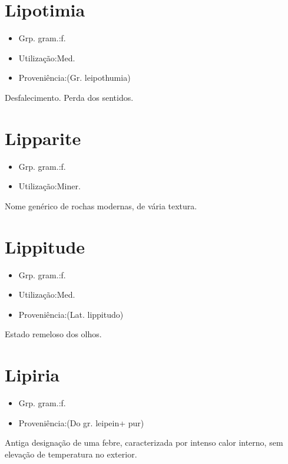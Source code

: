 \section{Lipotimia}
\begin{itemize}
\item {Grp. gram.:f.}
\end{itemize}
\begin{itemize}
\item {Utilização:Med.}
\end{itemize}
\begin{itemize}
\item {Proveniência:(Gr. \textunderscore leipothumia\textunderscore )}
\end{itemize}
Desfalecimento.
Perda dos sentidos.
\section{Lipparite}
\begin{itemize}
\item {Grp. gram.:f.}
\end{itemize}
\begin{itemize}
\item {Utilização:Miner.}
\end{itemize}
Nome genérico de rochas modernas, de vária textura.
\section{Lippitude}
\begin{itemize}
\item {Grp. gram.:f.}
\end{itemize}
\begin{itemize}
\item {Utilização:Med.}
\end{itemize}
\begin{itemize}
\item {Proveniência:(Lat. \textunderscore lippitudo\textunderscore )}
\end{itemize}
Estado remeloso dos olhos.
\section{Lipiria}
\begin{itemize}
\item {Grp. gram.:f.}
\end{itemize}
\begin{itemize}
\item {Proveniência:(Do gr. \textunderscore leipein\textunderscore  + \textunderscore pur\textunderscore )}
\end{itemize}
Antiga designação de uma febre, caracterizada por intenso calor interno, sem elevação de temperatura no exterior.
